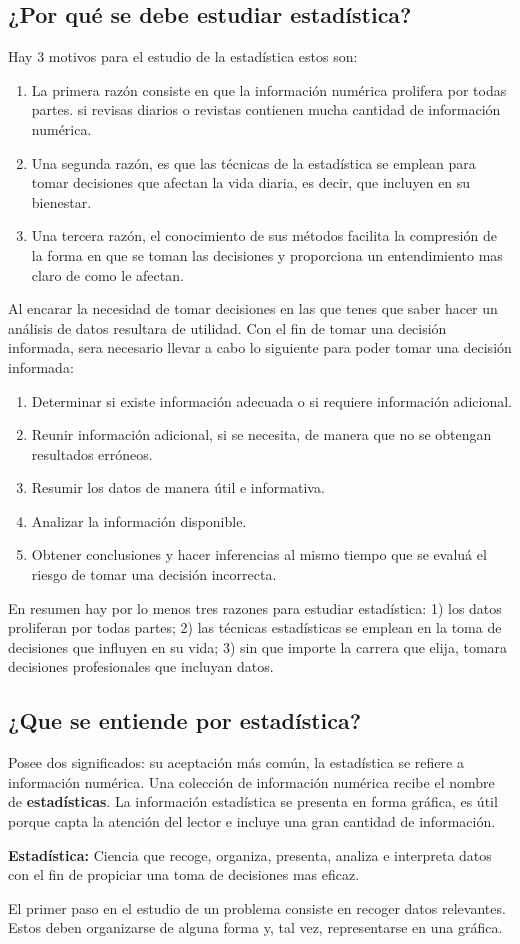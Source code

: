 \documentclass[]{article}
\begin{document}
\subsection{¿Por qué se debe estudiar estadística?}
Hay 3 motivos para el estudio de la estadística estos son:
\begin{enumerate}
	\item La primera razón consiste en que la información numérica prolifera por todas partes. si revisas diarios o revistas contienen mucha cantidad de información numérica.
	\item Una segunda razón, es que las técnicas de la estadística se emplean para tomar decisiones que afectan la vida diaria, es decir, que incluyen en su bienestar.
	\item Una tercera razón, el conocimiento de sus métodos facilita la compresión de la forma en que se toman las decisiones y proporciona un entendimiento mas claro de como le afectan. 
\end{enumerate}
Al encarar la necesidad de tomar decisiones en las que tenes que saber hacer un análisis de datos resultara de utilidad. Con el fin de tomar una decisión informada, sera necesario llevar a cabo lo siguiente para poder tomar una decisión informada:
\begin{enumerate}
	\item Determinar si existe información adecuada o si requiere información adicional.
	\item Reunir información adicional, si se necesita, de manera que no se obtengan resultados erróneos.
	\item Resumir los datos de manera útil e informativa.
	\item Analizar la información disponible.
	\item Obtener conclusiones y hacer inferencias al mismo tiempo que se evaluá el riesgo de tomar una decisión incorrecta.
\end{enumerate}
En resumen hay por lo menos tres razones para estudiar estadística: 1) los datos proliferan por todas partes; 2) las técnicas estadísticas se emplean en la toma de decisiones que influyen en su vida; 3) sin que importe la carrera que elija, tomara decisiones profesionales que incluyan datos.

\subsection{¿Que se entiende por estadística?}
Posee dos significados: su aceptación más común, la estadística se refiere a información numérica. Una colección de información numérica recibe el nombre de \textbf{estadísticas}. La información estadística se presenta en forma gráfica, es útil porque capta la atención del lector e incluye una gran cantidad de información. 
\begin{flushleft}
\textbf{Estadística:} Ciencia que recoge, organiza, presenta, analiza e interpreta datos con el fin de propiciar una toma de decisiones mas eficaz.
\end{flushleft}
El primer paso en el estudio de un problema consiste en recoger datos relevantes. Estos deben organizarse de alguna forma y, tal vez, representarse en una gráfica.
\end{document}
